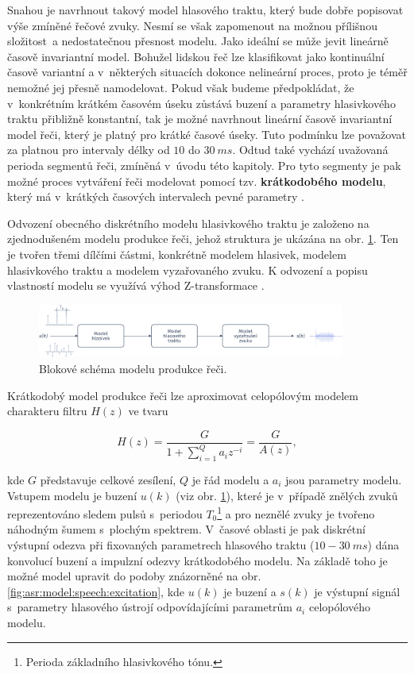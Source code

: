 Snahou je navrhnout takový model hlasového traktu, který bude dobře popisovat výše zmíněné řečové zvuky. Nesmí se však zapomenout na možnou přílišnou složitost~a nedostatečnou přesnost modelu. Jako ideální se může jevit lineárně časově invariantní model. Bohužel lidskou řeč lze klasifikovat jako kontinuální časově variantní a v~některých situacích dokonce nelineární proces, proto je téměř nemožné jej přesně namodelovat. Pokud však budeme předpokládat, že v~konkrétním krátkém časovém úseku zůstává buzení a parametry hlasivkového traktu přibližně konstantní, tak je možné navrhnout lineární časově invariantní model řeči, který je platný pro krátké časové úseky. Tuto podmínku lze považovat za platnou pro intervaly délky od $10$ do $30\ ms$. Odtud také vychází uvažovaná perioda segmentů řeči, zmíněná v~úvodu této kapitoly. Pro tyto segmenty je pak možné proces vytváření řeči modelovat pomocí tzv. \textbf{krátkodobého modelu}, který má v~krátkých časových intervalech pevné parametry \cite{Holmes2001}.

Odvození obecného diskrétního modelu hlasivkového traktu je založeno na zjednodušeném modelu produkce řeči, jehož struktura je ukázána na obr. \ref{fig:asr:model:speech}. Ten je tvořen třemi dílčími částmi, konkrétně modelem hlasivek, modelem hlasivkového traktu a modelem vyzařovaného zvuku. K odvození a popisu vlastností modelu se využívá výhod Z-transformace \cite{Psutka2006}.

\begin{figure}[hbpt]
  \centering
  \includegraphics[width=0.9\textwidth]{./ch4-asr/img/speech_model.pdf}
  \caption{Blokové schéma modelu produkce řeči.}
  \label{fig:asr:model:speech}
\end{figure}


Krátkodobý model produkce řeči lze aproximovat celopólovým modelem charakteru filtru $H(z)$ ve tvaru

\begin{equation}
  H(z) = \frac{G}{1 + \sum_{i = 1}^{Q} a_{i} z^{-i}} = \frac{G}{A(z)},
  \label{eq:asr:lpc:generic}
\end{equation}

\noindent kde $G$ představuje celkové zesílení, $Q$ je řád modelu a $a_i$ jsou parametry modelu. Vstupem modelu je buzení $u(k)$ (viz obr. \ref{fig:asr:model:speech}), které je v~případě znělých zvuků reprezentováno sledem pulsů s~periodou $T_0$\footnote{Perioda základního hlasivkového tónu.} a pro neznělé zvuky je tvořeno náhodným šumem s~plochým spektrem. V~časové oblasti je pak diskrétní výstupní odezva při fixovaných parametrech hlasového traktu ($10 - 30\ ms$) dána konvolucí buzení a impulzní odezvy krátkodobého modelu. Na základě toho je možné model upravit do podoby znázorněné na obr. \ref{fig:asr:model:speech:excitation}, kde $u(k)$ je buzení a $s(k)$ je výstupní signál s~parametry hlasového ústrojí odpovídajícími parametrům $a_i$ celopólového modelu.

